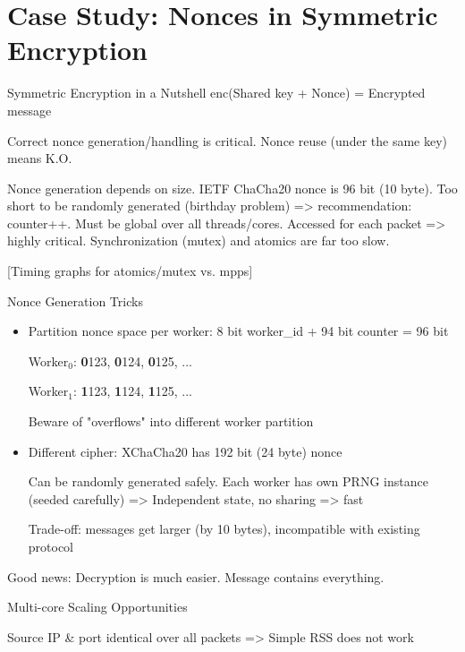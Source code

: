 \documentclass[NET,english]{tumbeamer}
\begin{document}
\section{Case Study: Nonces in Symmetric Encryption}
\begin{frame}{Symmetric Encryption in a Nutshell}
	enc(Shared key + Nonce) = Encrypted message
	
	Correct nonce generation/handling is critical. Nonce reuse (under the same key) means K.O.
	
	Nonce generation depends on size. IETF ChaCha20 nonce is 96 bit (10 byte). 
	Too short to be randomly generated (birthday problem) => recommendation: counter++. Must be global over all threads/cores. Accessed for each packet => highly critical. Synchronization (mutex) and atomics are far too slow.
	
	[Timing graphs for atomics/mutex vs. mpps]
\end{frame}

\begin{frame}{Nonce Generation Tricks}

	\begin{itemize}
		\item Partition nonce space per worker: 8 bit worker\_id + 94 bit counter = 96 bit
		
		Worker$_{0}$: \textbf{0}123, \textbf{0}124, \textbf{0}125, ...
		
		Worker$_{1}$: \textbf{1}123, \textbf{1}124, \textbf{1}125, ...
		
		Beware of "overflows" into different worker partition
		
		\item Different cipher: XChaCha20 has 192 bit (24 byte) nonce
		
		Can be randomly generated safely. Each worker has own PRNG instance (seeded carefully) => Independent state, no sharing => fast
		
		Trade-off: messages get larger (by 10 bytes), incompatible with existing protocol
	\end{itemize}

	\pause
	Good news: Decryption is much easier. Message contains everything.
\end{frame}

\begin{frame}{Multi-core Scaling Opportunities}
	
	Source IP \& port identical over all packets => Simple RSS does not work
	
	
\end{frame}
\end{document}
